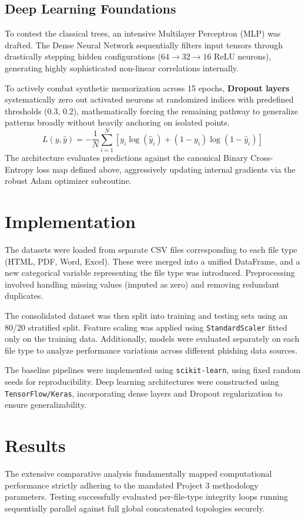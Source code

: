 \documentclass[12pt,a4paper]{article}
\begin{document}
\subsection{Deep Learning Foundations}
To contest the classical trees, an intensive Multilayer Perceptron (MLP) was drafted. The Dense Neural Network sequentially filters input tensors through drastically stepping hidden configurations ($64 \to 32 \to 16$ ReLU neurons), generating highly sophisticated non-linear correlations internally. 

To actively combat synthetic memorization across 15 epochs, \textbf{Dropout layers} systematically zero out activated neurons at randomized indices with predefined thresholds (0.3, 0.2), mathematically forcing the remaining pathway to generalize patterns broadly without heavily anchoring on isolated points.
\begin{equation}
L(y, \hat{y}) = - \frac{1}{N} \sum_{i=1}^{N} \left[ y_i \log(\hat{y}_i) + (1-y_i) \log(1 - \hat{y}_i) \right]
\end{equation}
The architecture evaluates predictions against the canonical Binary Cross-Entropy loss map defined above, aggressively updating internal gradients via the robust Adam optimizer subroutine.

\section{Implementation}
The datasets were loaded from separate CSV files corresponding to each file type (HTML, PDF, Word, Excel). These were merged into a unified DataFrame, and a new categorical variable representing the file type was introduced. Preprocessing involved handling missing values (imputed as zero) and removing redundant duplicates.

The consolidated dataset was then split into training and testing sets using an 80/20 stratified split. Feature scaling was applied using \texttt{StandardScaler} fitted only on the training data. Additionally, models were evaluated separately on each file type to analyze performance variations across different phishing data sources.

The baseline pipelines were implemented using \texttt{scikit-learn}, using fixed random seeds for reproducibility. Deep learning architectures were constructed using \texttt{TensorFlow/Keras}, incorporating dense layers and Dropout regularization to ensure generalizability.

\section{Results}
The extensive comparative analysis fundamentally mapped computational performance strictly adhering to the mandated Project 3 methodology parameters. Testing successfully evaluated per-file-type integrity loops running sequentially parallel against full global concatenated topologies securely.
\end{document}

